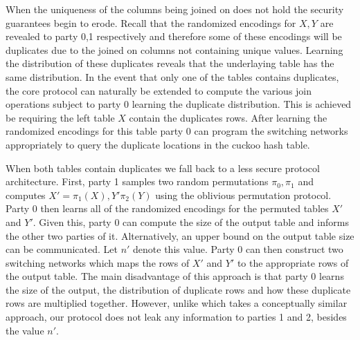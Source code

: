 When the uniqueness of the columns being joined on does not hold the security guarantees begin to erode. Recall that the randomized encodings for $X,Y$ are revealed to party 0,1 respectively and therefore some of these encodings will be duplicates due to the joined on columns not containing unique values. Learning the distribution of these duplicates reveals that the underlaying table has the same distribution. In the event that only one of the tables contains duplicates, the core protocol can naturally be extended to compute the various join operations subject to party 0 learning the duplicate distribution. This is achieved be requiring the left table $X$ contain the duplicates rows. After learning the randomized encodings for this table party 0 can program the switching networks appropriately to query the duplicate locations in the cuckoo hash table. 


When both tables contain duplicates we fall back to a less secure protocol architecture. First, party 1 samples two random permutations $\pi_0,\pi_1$ and computes $X'=\pi_1(X),Y'\pi_2(Y)$ using the oblivious permutation protocol. Party 0 then learns all of the randomized encodings for the permuted tables $X'$ and $Y'$. Given this, party 0 can compute the size of the output table and informs the other two parties of it. Alternatively, an upper bound on the output table size can be communicated. Let $n'$ denote this value. Party 0 can then construct two switching networks which maps the rows of $X'$ and $Y'$ to the appropriate rows of the output table. The main disadvantage of this approach is that party 0 learns the size of the output, the distribution of duplicate rows and how these duplicate rows are multiplied together. However, unlike \cite{LTW13} which takes a conceptually similar approach, our protocol does not leak any information to parties 1 and 2, besides the value $n'$.


